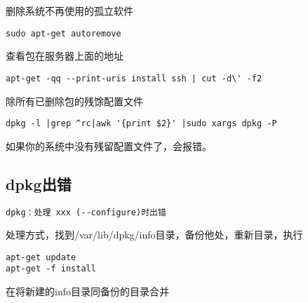 删除系统不再使用的孤立软件
\begin{verbatim}
sudo apt-get autoremove
\end{verbatim}

查看包在服务器上面的地址
\begin{verbatim}
apt-get -qq --print-uris install ssh | cut -d\' -f2
\end{verbatim}

除所有已删除包的残馀配置文件
\begin{verbatim}
dpkg -l |grep ^rc|awk '{print $2}' |sudo xargs dpkg -P 
\end{verbatim}
如果你的系统中没有残留配置文件了，会报错。

\subsection{dpkg出错}
\label{err:dpkgConfig}
\begin{verbatim}
dpkg：处理 xxx (--configure)时出错
\end{verbatim}
处理方式，找到/var/lib/dpkg/info目录，备份他处，重新目录，执行
\begin{verbatim}
apt-get update
apt-get -f install
\end{verbatim}
在将新建的info目录同备份的目录合并





















